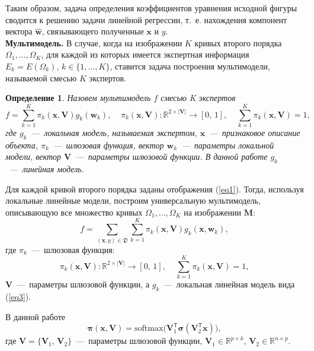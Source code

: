 \documentclass[12pt, twoside]{article}
\newtheorem{definition}{Определение}[section]
\numberwithin{equation}{section}
\begin{document}
    Таким образом, задача определения коэффициентов уравнения исходной фигуры сводится к решению задачи линейной регрессии, т.~е. нахождения компонент вектора $\hat{\mathbf{w}}$, связывающего полученные $\mathbf{x}$ и $y$. \\
\textbf{Мультимодель.} В случае, когда на изображении $K$ кривых второго порядка  $\Omega_1, \dots, \Omega_K$, для каждой из которых имеется экспертная информация $E_k = E(\Omega_k), \, k \in \{1, \dots, K\}$, ставится задача построения мультимодели, называемой смесью $K$ экспертов. 
\begin{definition} Назовем мультимодель $f$ смесью K экспертов \begin{equation}
  f = \sum\limits_{k = 1}^{K}\pi_k(\mathbf{x}, \mathbf{V})g_k(\mathbf{w}_k),  \; \; \; \; \pi_k(\mathbf{x}, \mathbf{V}): \mathbb{R}^{2\times |\mathbf{V}|} \rightarrow [0, \, 1], \; \; \; \; \sum\limits_{k = 1}^{K}\pi_k(\mathbf{x}, \mathbf{V}) = 1, 
\end{equation} где $g_k$~---~локальная модель, называемая экспертом, $\mathbf{x}$~---~признаковое описание объекта, $\pi_k$~---~шлюзовая функция, вектор $\mathbf{w}_k$~---~параметры локальной модели, вектор $\mathbf{V}$~---~параметры шлюзовой функции. В данной работе $g_k$~---~линейная модель. \end{definition}

Для каждой кривой второго порядка заданы отображения (\ref{eq1}). Тогда, используя локальные линейные модели, построим универсальную мультимодель, описывающую все множество кривых $\Omega_1, \dots, \Omega_K$ на изображении $\mathbf{M}$:
\begin{equation}\label{5}
f = \sum\limits_{(\mathbf{x}, y) \in \mathfrak{D}} \sum\limits_{k = 1}^{K} \pi_k(\mathbf{x}, \mathbf{V})g_k(\mathbf{x}, \mathbf{w}_k), 
\end{equation} где $\pi_k$~---~шлюзовая функция: 
\begin{equation}\label{6}
\pi_k(\mathbf{x}, \mathbf{V}): \mathbb{R}^{2\times |\mathbf{V}|} \rightarrow [0, \, 1], \; \; \; \; \sum\limits_{k = 1}^{K}\pi_k(\mathbf{x}, \mathbf{V}) = 1,\end{equation}
    $\mathbf{V}$~---~параметры шлюзовой функции, а $g_k$~---~локальная линейная модель вида (\ref{eq3}).
    
В данной работе
\begin{equation}
    \boldsymbol{\pi}(\mathbf{x}, \mathbf{V}) = \text{softmax}\bigl(\mathbf{V}_1^{\mathsf{T}}\boldsymbol{\sigma}(\mathbf{V}_2^{\mathsf{T}}\mathbf{x}) \bigr),
\end{equation}
где $\mathbf{V} = \{ \mathbf{V}_1, \, \mathbf{V}_2\}$~---~параметры шлюзовой функции, $\mathbf{V}_1 \in \mathbb{R}^{p \times k}, \, \mathbf{V}_2 \in \mathbb{R}^{n \times p}$. 
\end{document}
